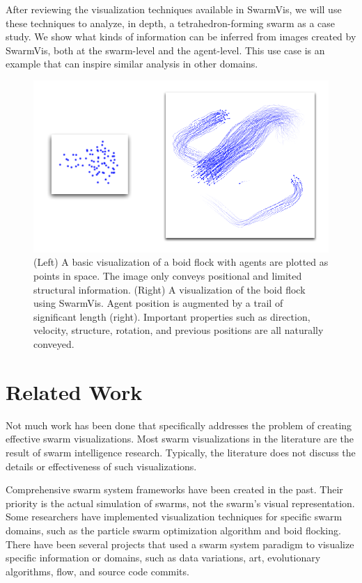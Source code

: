\documentclass{vgtc}
\begin{document}
After reviewing the visualization techniques available in SwarmVis, we will use these techniques to analyze, in depth,
a tetrahedron-forming swarm as a case study. We show what kinds of information can be inferred from images created by SwarmVis,
both at the swarm-level and the agent-level. This use case is an example that can inspire similar analysis in other domains.


\begin{figure}
\centering
\includegraphics[scale=.55]{images/intro.pdf}
\caption{(Left) A basic visualization of a boid flock with agents are plotted as
points in space. The image only conveys positional and limited structural information.
(Right) A visualization of the boid flock using SwarmVis. Agent
position is augmented by a trail of significant length (right).
Important properties such as direction, velocity, structure, rotation,
and previous positions are all naturally conveyed.
}
\label{Intro}
\end{figure}




\section{Related Work}
Not much work has been done that specifically addresses the problem of creating effective swarm visualizations.
Most swarm visualizations in the literature are the result of swarm intelligence research.
Typically, the literature does not discuss the details or effectiveness of such visualizations. 

Comprehensive  swarm system frameworks\cite{Luke}\cite{860347} have been created in the past.
Their priority is the actual simulation of swarms, not the swarm's visual representation.
Some researchers have implemented visualization techniques for specific swarm domains,
such as the particle swarm optimization algorithm\cite{Secrest} and boid flocking\cite{reynolds1987}.
There have been several projects that used a swarm system paradigm to visualize specific information or domains, such as data variations\cite{1382896}, art\cite{Boyd}, evolutionary algorithms\cite{spector2005ecb}\cite{Spector02evolutionarydynamics},
flow\cite{10.1109/TVCG.2005.87}\cite{Merzkirch}, and source code commits\cite{codeswarm:website}.
\end{document}
